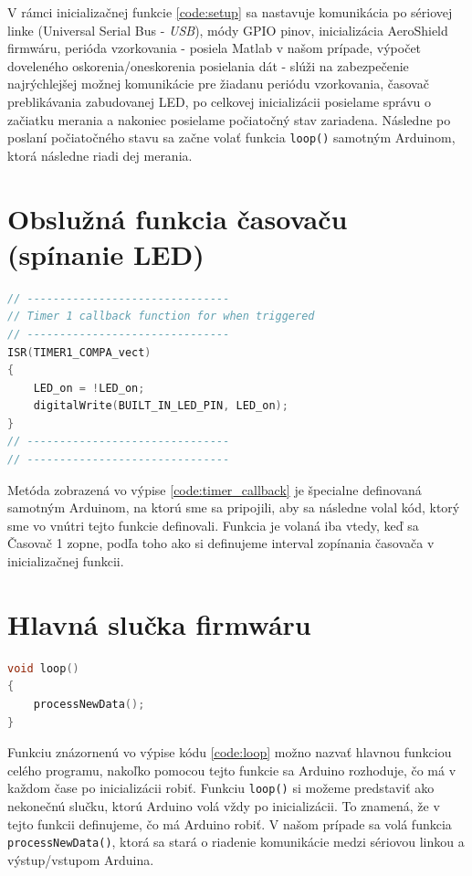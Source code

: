 \documentclass[a4paper, 10pt, ]{article}
\begin{document}
V rámci inicializačnej funkcie \ref{code:setup} sa nastavuje komunikácia po sériovej linke (Universal Serial Bus - \emph{USB}), módy GPIO pinov, inicializácia AeroShield firmwáru, perióda vzorkovania - posiela Matlab v našom prípade, výpočet doveleného oskorenia/oneskorenia posielania dát - slúži na zabezpečenie najrýchlejšej možnej komunikácie pre žiadanu periódu vzorkovania, časovač preblikávania zabudovanej LED, po celkovej inicializácii posielame správu o začiatku merania a nakoniec posielame počiatočný stav zariadena. Následne po poslaní počiatočného stavu sa začne volať funkcia \texttt{loop()} samotným Arduinom, ktorá následne riadi dej merania.

\section{Obslužná funkcia časovaču (spínanie LED)}
\begin{lstlisting}[caption=Spínanie LED v obslužnej funkcii \emph{Časovača 1.}, label={code:timer_callback}, language=C++]
// -------------------------------
// Timer 1 callback function for when triggered
// -------------------------------
ISR(TIMER1_COMPA_vect)
{
    LED_on = !LED_on;
    digitalWrite(BUILT_IN_LED_PIN, LED_on);
}
// -------------------------------
// -------------------------------
\end{lstlisting}

Metóda zobrazená vo výpise \ref{code:timer_callback} je špecialne definovaná samotným Arduinom, na ktorú sme sa pripojili, aby sa následne volal kód, ktorý sme vo vnútri tejto funkcie definovali. Funkcia je volaná iba vtedy, keď sa Časovač 1 zopne, podľa toho ako si definujeme interval zopínania časovača v inicializačnej funkcii.

\section{Hlavná slučka firmwáru}
\begin{lstlisting}[caption=Hlavná slučka Arduino programu., label={code:loop}, language=C++]
void loop()
{
    processNewData();
}
\end{lstlisting}

Funkciu znázornenú vo výpise kódu \ref{code:loop} možno nazvať hlavnou funkciou celého programu, nakoľko pomocou tejto funkcie sa Arduino rozhoduje, čo má v každom čase po inicializácii robiť. Funkciu \texttt{loop()} si možeme predstaviť ako nekonečnú slučku, ktorú Arduino volá vždy po inicializácii. To znamená, že v tejto funkcii definujeme, čo má Arduino robiť. V našom prípade sa volá funkcia \texttt{processNewData()}, ktorá sa stará o riadenie komunikácie medzi sériovou linkou a výstup/vstupom Arduina.


\end{document}
